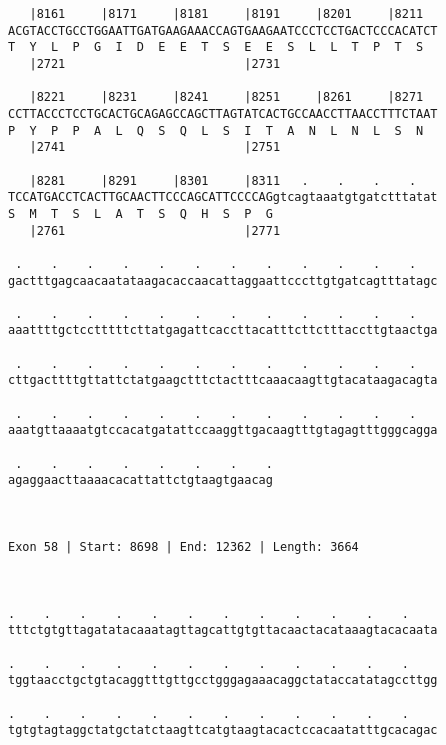 \documentclass{article}
\begin{document}
\begin{Verbatim}
   |8161     |8171     |8181     |8191     |8201     |8211  
ACGTACCTGCCTGGAATTGATGAAGAAACCAGTGAAGAATCCCTCCTGACTCCCACATCT
T  Y  L  P  G  I  D  E  E  T  S  E  E  S  L  L  T  P  T  S  
   |2721                         |2731                      
  
   |8221     |8231     |8241     |8251     |8261     |8271  
CCTTACCCTCCTGCACTGCAGAGCCAGCTTAGTATCACTGCCAACCTTAACCTTTCTAAT
P  Y  P  P  A  L  Q  S  Q  L  S  I  T  A  N  L  N  L  S  N  
   |2741                         |2751                      
  
   |8281     |8291     |8301     |8311   .    .    .    .   
TCCATGACCTCACTTGCAACTTCCCAGCATTCCCCAGgtcagtaaatgtgatctttatat
S  M  T  S  L  A  T  S  Q  H  S  P  G                       
   |2761                         |2771                      
  
 .    .    .    .    .    .    .    .    .    .    .    .   
gactttgagcaacaatataagacaccaacattaggaattcccttgtgatcagtttatagc
                                                            
 .    .    .    .    .    .    .    .    .    .    .    .   
aaattttgctcctttttcttatgagattcaccttacatttcttctttaccttgtaactga
                                                            
 .    .    .    .    .    .    .    .    .    .    .    .   
cttgacttttgttattctatgaagctttctactttcaaacaagttgtacataagacagta
                                                            
 .    .    .    .    .    .    .    .    .    .    .    .   
aaatgttaaaatgtccacatgatattccaaggttgacaagtttgtagagtttgggcagga
                                                            
 .    .    .    .    .    .    .    .
agaggaacttaaaacacattattctgtaagtgaacag
                                     
                                     
 
Exon 58 | Start: 8698 | End: 12362 | Length: 3664



.    .    .    .    .    .    .    .    .    .    .    .    
tttctgtgttagatatacaaatagttagcattgtgttacaactacataaagtacacaata
                                                            
.    .    .    .    .    .    .    .    .    .    .    .    
tggtaacctgctgtacaggtttgttgcctgggagaaacaggctataccatatagccttgg
                                                            
.    .    .    .    .    .    .    .    .    .    .    .    
tgtgtagtaggctatgctatctaagttcatgtaagtacactccacaatatttgcacagac
                                                            

\end{Verbatim}
\end{document}
